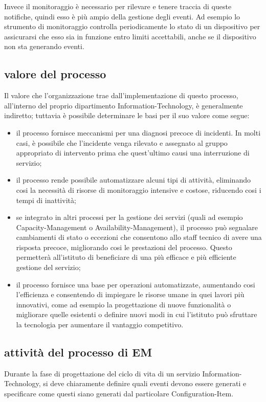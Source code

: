Invece il monitoraggio è necessario per rilevare e tenere traccia di queste notifiche, quindi esso è più ampio della gestione degli eventi. Ad esempio lo strumento di monitoraggio controlla periodicamente lo stato di un dispositivo per assicurarsi che esso sia in funzione entro limiti accettabili, anche se il dispositivo non sta generando eventi.

\subsection[Valore del processo]{valore del processo}
\label{prc-event-value}
Il valore che l'organizzazione trae dall'implementazione di questo processo, all'interno del proprio dipartimento \acs{Information-Technology}, è generalmente indiretto; tuttavia è possibile determinare le basi per il suo valore come segue:

\begin{itemize}
\item{il processo fornisce meccanismi per una diagnosi precoce di incidenti. In molti casi, è possibile che l'incidente venga rilevato e assegnato al gruppo appropriato di intervento prima che quest'ultimo causi una interruzione di servizio;}
\item{il processo rende possibile automatizzare alcuni tipi di attività, eliminando cosi la necessità di risorse di monitoraggio  intensive e costose, riducendo cosi i tempi di inattività;}
\item{se integrato in altri processi per la gestione dei servizi (quali ad esempio \ac{Capacity-Management} o \ac{Availability-Management}), il processo può segnalare cambiamenti di stato o eccezioni che consentono allo staff tecnico di avere una risposta precoce, migliorando cosi le prestazioni del processo. Questo permetterà all'istituto di beneficiare di una più efficace e più efficiente gestione del servizio;}
\item{il processo fornisce una base per operazioni automatizzate, aumentando cosi l'efficienza e consentendo di impiegare le risorse umane in quei lavori più innovativi, come ad esempio la progettazione di nuove funzionalità o migliorare quelle esistenti o definire nuovi modi in cui l'istituto può sfruttare la tecnologia per aumentare il vantaggio competitivo.}
\end{itemize}

\subsection[Attività del processo di EM]{attività del processo di EM}
\label{prc-event-activities}
Durante la fase di progettazione del ciclo di vita di un servizio \acs{Information-Technology}, si deve chiaramente definire quali eventi devono essere generati e specificare come questi siano generati dal particolare \ac{Configuration-Item}.

